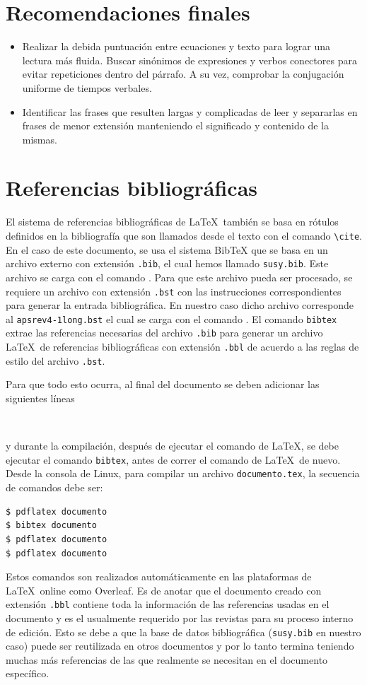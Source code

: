 \documentclass{article}
\begin{document}
\section{Recomendaciones finales}
\begin{itemize}
\item Realizar la debida puntuación entre ecuaciones y
texto para lograr una lectura más fluida. Buscar sinónimos de expresiones
y verbos conectores para evitar repeticiones dentro del párrafo. A su vez, comprobar
la conjugación uniforme de tiempos verbales.
\item Identificar las frases que resulten largas y complicadas de
leer y separarlas en frases de menor extensión manteniendo el significado
y contenido de la mismas.
\end{itemize}

\section{Referencias bibliográficas}
El sistema de referencias bibliográficas de \LaTeX\ también se basa en rótulos definidos en la bibliografía que son llamados desde el texto con el comando  \verb|\cite|. En el caso de este documento, se usa el sistema BibTeX que se basa en un archivo externo con extensión \verb|.bib|, el cual hemos llamado \verb|susy.bib|. Este archivo  se carga con el comando \verb||. Para que este archivo pueda ser procesado, se requiere un archivo con extensión \verb|.bst|  con las instrucciones correspondientes para generar la entrada bibliográfica. En nuestro caso dicho  archivo corresponde al \verb|apsrev4-1long.bst| el cual se carga con el comando \verb||.
El comando \verb|bibtex| extrae las referencias necesarias del archivo \verb|.bib| para generar un archivo \LaTeX\ de referencias bibliográficas con extensión \verb|.bbl| de acuerdo a las reglas de estilo del archivo \verb|.bst|.

Para que todo esto ocurra, al final del documento se deben adicionar las siguientes líneas 
\begin{lstlisting}


\end{lstlisting}
y durante la compilación, después de ejecutar el comando de \LaTeX, se debe ejecutar el comando \verb|bibtex|, antes de correr el comando de \LaTeX\ de nuevo. Desde la consola de Linux, para compilar un archivo \verb|documento.tex|, la secuencia de comandos debe ser:
\begin{lstlisting}
$ pdflatex documento 
$ bibtex documento
$ pdflatex documento 
$ pdflatex documento 
\end{lstlisting}
Estos comandos son realizados automáticamente en las plataformas de \LaTeX\ online como Overleaf. 
Es de anotar que el documento creado con extensión \verb|.bbl| contiene toda la información de las referencias usadas en el documento y es el usualmente requerido por las revistas para su proceso interno de edición. Esto se debe a que la base de datos  bibliográfica (\verb|susy.bib| en nuestro caso)  puede ser reutilizada en otros documentos y por lo tanto termina teniendo muchas más referencias de las que realmente se necesitan en el documento específico.
\end{document}
